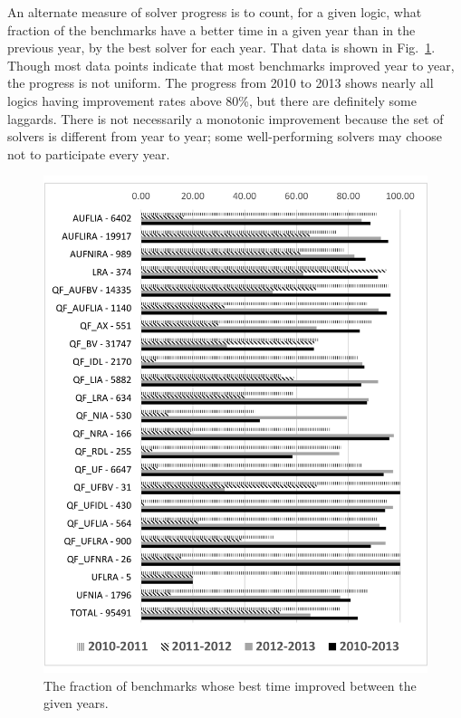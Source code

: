 \documentclass[smallcondensed]{svjour3}
\begin{document}
An alternate measure of solver progress is to count, for a given logic, what fraction of the benchmarks have a better time in a given year than in the previous year, by the best solver for each year. That data is shown in Fig.~\ref{Fig:bettertime}. Though most data points indicate that most benchmarks improved year to year, the progress is not uniform. The progress from 2010 to 2013 shows nearly all logics having improvement rates above 80\%, but there are definitely some laggards. There is not necessarily a monotonic improvement because the set of solvers is different from year to year; some well-performing solvers may choose not to participate every year.

\begin{figure}
\centering
%
\includegraphics[width=\textwidth]{bettertime.pdf}
\caption{The fraction of benchmarks whose best time improved between the given years.}
\label{Fig:bettertime}
\end{figure}
\end{document}
